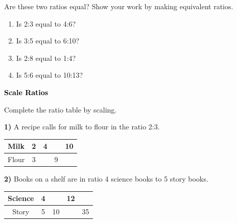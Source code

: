 \documentclass[12pt, letterpaper, fleqn]{article}
\newcommand{\blank}{\underline{\hspace{2.2cm}}}
\begin{document}
\noindent
Are these two ratios equal? Show your work by making equivalent ratios.

\vspace{3mm}

\begin{enumerate}[itemsep=2cm, leftmargin=0.6cm]

\item Is 2:3 equal to 4:6?

\vspace{1.5cm}

\item Is 3:5 equal to 6:10?

\vspace{1.5cm}

\item Is 2:8 equal to 1:4?

\vspace{1.5cm}

\item Is 5:6 equal to 10:13?

\vspace{1.5cm}

\end{enumerate}

\newpage

\begin{tcolorbox}[colback=customteal!20]
\large\textcolor{black}{\textbf{Scale Ratios}}
\end{tcolorbox}

\noindent
Complete the ratio table by scaling.

\vspace{3mm}

\noindent
\textbf{1)} A recipe calls for milk to flour in the ratio 2:3.

\begin{center}
\begin{tabular}{c|c|c|c|c}
Milk & 2 & 4 & \blank & 10 \\
\hline
Flour & 3 & \blank & 9 & \blank
\end{tabular}
\end{center}

\vspace{2cm}

\noindent
\textbf{2)} Books on a shelf are in ratio 4 science books to 5 story books.

\begin{center}
\begin{tabular}{c|c|c|c|c}
Science & 4 & \blank & 12 & \blank \\
\hline
Story & 5 & 10 & \blank & 35
\end{tabular}
\end{center}
\end{document}
